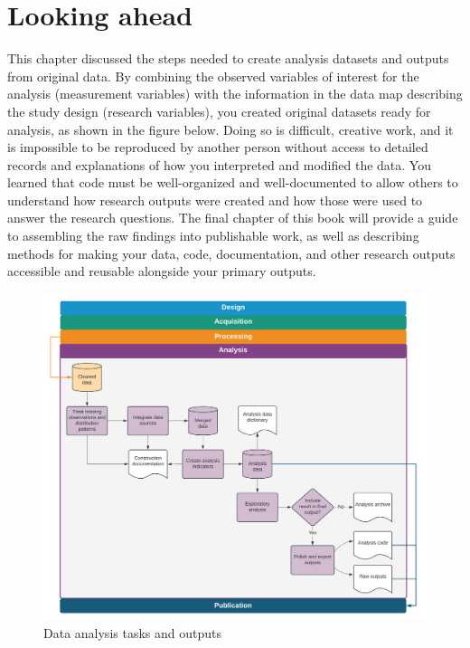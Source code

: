 \documentclass[
]{book}
\begin{document}
\hypertarget{looking-ahead-6}{%
\section*{Looking ahead}\label{looking-ahead-6}}

This chapter discussed the steps needed to
create analysis datasets and outputs from original data.
By combining the observed variables of interest for the analysis (measurement variables)
with the information in the data map describing the study design (research variables),
you created original datasets ready for analysis,
as shown in the figure below.
Doing so is difficult, creative work,
and it is impossible to be reproduced by another person
without access to detailed records and explanations
of how you interpreted and modified the data.
You learned that code must be well-organized and well-documented
to allow others to understand how research outputs were created
and how those were used to answer the research questions.
The final chapter of this book will provide a guide
to assembling the raw findings into publishable work,
as well as describing methods for making your data,
code, documentation, and other research outputs
accessible and reusable alongside your primary outputs.

\begin{figure}
\includegraphics[width=41.51in]{diagrams/Analysis} \caption{Data analysis tasks and outputs}\label{fig:unnamed-chunk-43}
\end{figure}
\end{document}
